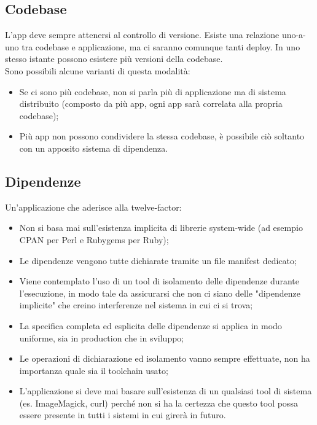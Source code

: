 \documentclass[PianoDiQualifica.tex]{subfiles}
\begin{document}
\subsection{Codebase}
L'app deve sempre attenersi al controllo di versione. Esiste una relazione uno-a-uno tra codebase e applicazione, ma ci saranno comunque tanti deploy. In uno stesso istante possono esistere più versioni della codebase.\\
Sono possibili alcune varianti di questa modalità:
\begin{itemize}
\item Se ci sono più codebase, non si parla più di applicazione ma di sistema distribuito (composto da più app, ogni app sarà correlata alla propria codebase);
\item Più app non possono condividere la stessa codebase, è possibile ciò soltanto con un apposito sistema di dipendenza.
\end{itemize}

\subsection{Dipendenze}
Un'applicazione che aderisce alla twelve-factor:
\begin{itemize}
\item Non si basa mai sull'esistenza implicita di librerie system-wide (ad esempio CPAN per Perl e Rubygems per Ruby);
\item Le dipendenze vengono tutte dichiarate tramite un file manifest dedicato;
\item Viene contemplato l'uso di un tool di isolamento delle dipendenze durante l'esecuzione, in modo tale da assicurarsi che non ci siano delle "dipendenze implicite" che creino interferenze nel sistema in cui ci si trova;
\item La specifica completa ed esplicita delle dipendenze si applica in modo uniforme, sia in production che in sviluppo;
\item Le operazioni di dichiarazione ed isolamento vanno sempre effettuate, non ha importanza quale sia il toolchain usato;
\item L'applicazione si deve mai basare sull'esistenza di un qualsiasi tool di sistema (es. ImageMagick, curl) perché non si ha la certezza che questo tool possa essere presente in tutti i sistemi in cui girerà in futuro.
\end{itemize}
\end{document}
